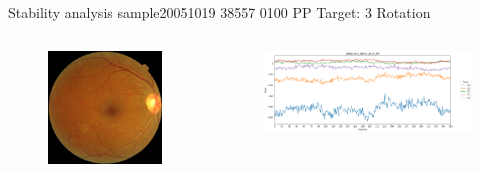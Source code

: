 \documentclass{beamer}
\begin{document}
\begin{frame}{Stability analysis sample}{20051019 38557 0100 PP Target: 3 Rotation}
\begin{columns}
	\begin{column}{0.3\textwidth}
		\begin{figure}[p]
			\centering
			\includegraphics[width=\textwidth]{chapter_stability/20051019_38557_0100_PP/20051019_38557_0100_PP.jpeg}
		\end{figure}	
	\end{column}
	\begin{column}{0.45\textwidth}  %
		\begin{figure}[p]
			\centering
			\includegraphics[width=\textwidth]{chapter_stability/20051019_38557_0100_PP/r/scores.png}
		\end{figure}
		\centering
		\href{run:videos_stability/Messidor_20051019_38557_0100_PP_Target_3_Checking_Rotation_Sensitivity.mp4}{\color{blue}{Rotation Visualization}} 
	\end{column}
\end{columns}
\end{frame}
\end{document}
